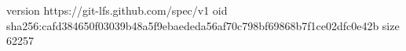 version https://git-lfs.github.com/spec/v1
oid sha256:cafd384650f03039b48a5f9ebaededa56af70c798bf69868b7f1ce02dfc0e42b
size 62257

